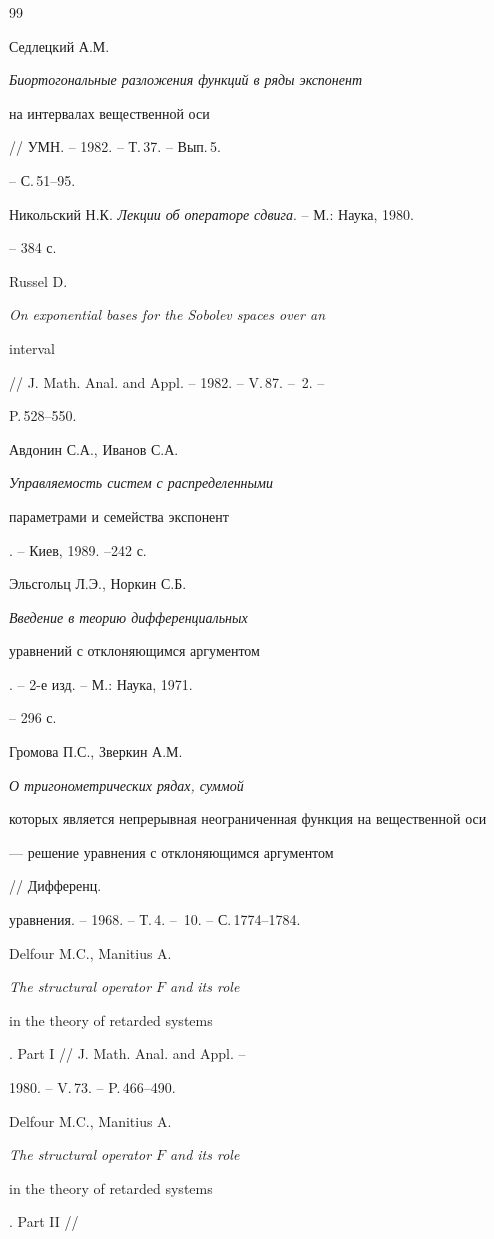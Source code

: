 \begin{thebibliography}{99}


Седлецкий А.М. {\em Биортогональные разложения функций в ряды экспонент 


на интервалах вещественной оси} // УМН. -- 1982. -- Т.\,37. -- Вып.\,5. 


-- С.\,51--95. 




Никольский Н.К. {\em Лекции об операторе сдвига}. -- М.: Наука, 1980. 


-- 384 с. 




Russel D. {\em On exponential bases for the Sobolev spaces over an 


interval} // J. Math. Anal. and Appl. -- 1982. -- V.\,87. -- \No\,2. -- 


P.\,528--550. 




Авдонин С.А., Иванов С.А. {\em Управляемость систем с распределенными 


параметрами и семейства экспонент}. -- Киев, 1989. --242 с. 




Эльсгольц Л.Э., Норкин С.Б. {\em Введение в теорию дифференциальных 


уравнений с отклоняющимся аргументом}. -- 2-е изд. -- М.: Наука, 1971. 


-- 296 с. 




Громова П.С., Зверкин А.М. {\em О тригонометрических рядах, суммой 


которых является непрерывная неограниченная функция на вещественной оси 


--- решение уравнения с отклоняющимся аргументом} // Дифференц. 


уравнения. -- 1968. -- Т.\,4. -- \No\,10. -- С.\,1774--1784. 




Delfour M.C., Manitius A. {\em The structural operator $F$ and its role 


in the theory of retarded systems}. Part I // J. Math. Anal. and Appl. -- 


1980. -- V.\,73. -- P.\,466--490. 




Delfour M.C., Manitius A. {\em The structural operator $F$ and its role 


in the theory of retarded systems}. Part II //  



\end{thebibliography}
